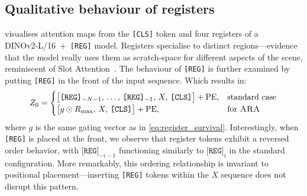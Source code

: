 \documentclass{article}
\newcommand{\RegTok}{\texttt{[REG]}\xspace}
\newcommand{\citep}{\parencite}
\newcommand{\OURS}{\textsc{ARA}\xspace}
\begin{document}
\subsection{Qualitative behaviour of registers}
 visualises attention maps from the \texttt{[CLS]} token and four registers of a DINOv2‑L/16 + \RegTok model.
Registers specialise to distinct regions—evidence that the model really uses them as scratch‑space for different aspects of the scene, reminiscent of Slot Attention \citep{locatelloObjectCentricLearningSlot2020}.
The behaviour of \RegTok is further examined by putting \RegTok in the front of the input sequence. Which results in:
\begin{equation}
Z_0=\begin{cases}
\bigl[\RegTok_{-N-1},\, \ldots,\, \RegTok_{-1},\, X,\, \texttt{[CLS]}\bigr]+\text{PE}, & \text{standard case} \\
\bigl[g\odot R_{\max},\, X,\, \texttt{[CLS]}\bigr]+\text{PE}, & \text{for \OURS}
\end{cases}
\end{equation}
where $g$ is the same gating vector as in \cref{eq:register_survival}. 
Interestingly, when \RegTok is placed at the front, we observe that register tokens exhibit a reversed order behavior, with $\RegTok_{-i-1}$ functioning similarly to $\RegTok_{i}$ in the standard configuration.
More remarkably, this ordering relationship is invariant to positional placement—inserting \RegTok tokens within the $X$ sequence does not disrupt this pattern.
\end{document}
